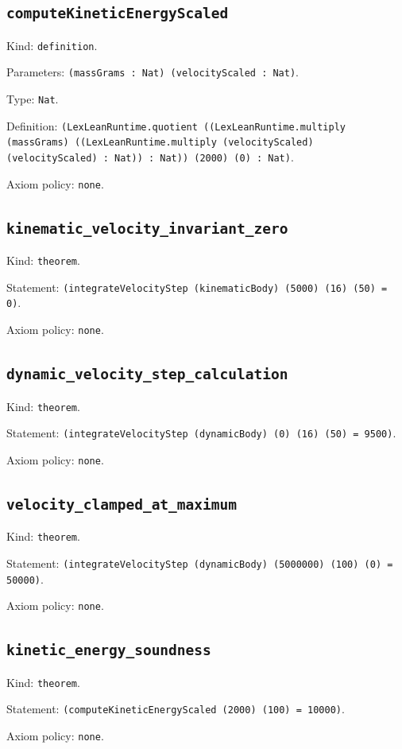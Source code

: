 \documentclass[11pt]{article}
\begin{document}
\subsection*{\texttt{computeKineticEnergyScaled}}
\noindent Kind: \texttt{definition}.\par
\noindent Parameters: \texttt{(massGrams : Nat) (velocityScaled : Nat)}.\par
\noindent Type: \texttt{Nat}.\par
\noindent Definition: \texttt{(LexLeanRuntime.quotient ((LexLeanRuntime.multiply (massGrams) ((LexLeanRuntime.multiply (velocityScaled) (velocityScaled) : Nat)) : Nat)) (2000) (0) : Nat)}.\par
\noindent Axiom policy: \texttt{none}.\par
\subsection*{\texttt{kinematic\_velocity\_invariant\_zero}}
\noindent Kind: \texttt{theorem}.\par
\noindent Statement: \texttt{(integrateVelocityStep (kinematicBody) (5000) (16) (50) = 0)}.\par
\noindent Axiom policy: \texttt{none}.\par
\subsection*{\texttt{dynamic\_velocity\_step\_calculation}}
\noindent Kind: \texttt{theorem}.\par
\noindent Statement: \texttt{(integrateVelocityStep (dynamicBody) (0) (16) (50) = 9500)}.\par
\noindent Axiom policy: \texttt{none}.\par
\subsection*{\texttt{velocity\_clamped\_at\_maximum}}
\noindent Kind: \texttt{theorem}.\par
\noindent Statement: \texttt{(integrateVelocityStep (dynamicBody) (5000000) (100) (0) = 50000)}.\par
\noindent Axiom policy: \texttt{none}.\par
\subsection*{\texttt{kinetic\_energy\_soundness}}
\noindent Kind: \texttt{theorem}.\par
\noindent Statement: \texttt{(computeKineticEnergyScaled (2000) (100) = 10000)}.\par
\noindent Axiom policy: \texttt{none}.\par
\end{document}
